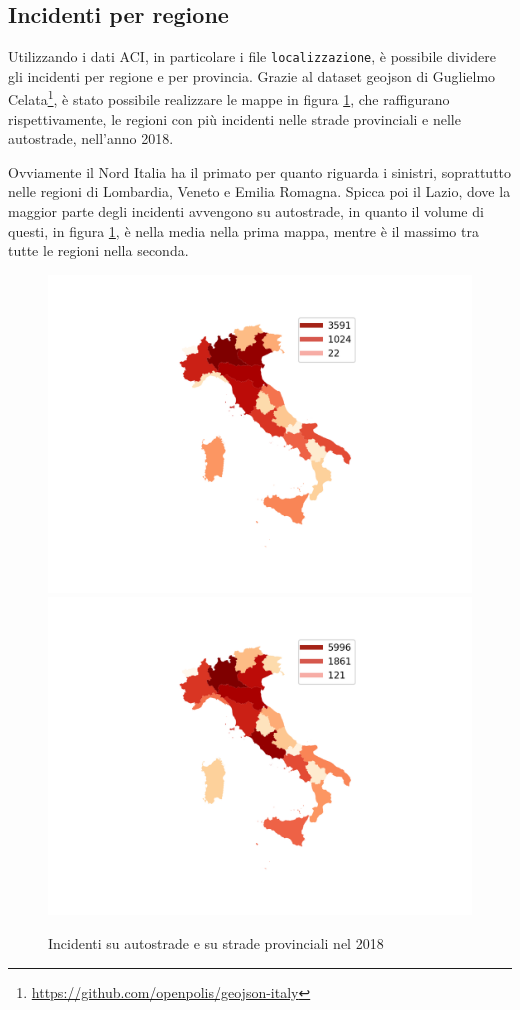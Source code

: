 \documentclass[a4paper,12pt]{report}
\newcommand{\columnstyle}[1]{\texttt{#1}}
\begin{document}
\subsection{Incidenti per regione}

Utilizzando i dati ACI, in particolare i file \columnstyle{localizzazione}, è 
possibile dividere gli incidenti per regione e per provincia.
Grazie al dataset geojson di Guglielmo 
Celata\footnote{\url{https://github.com/openpolis/geojson-italy}}, 
è stato possibile realizzare le mappe in figura \ref{fig:incidenti-per-regione}, 
che raffigurano rispettivamente, le regioni con più incidenti 
nelle strade provinciali e nelle autostrade, nell'anno 2018.

Ovviamente il Nord Italia ha il primato per quanto riguarda i sinistri, 
soprattutto nelle regioni di Lombardia, Veneto e Emilia Romagna. 
Spicca poi il Lazio, dove la maggior parte degli incidenti avvengono su autostrade, 
in quanto il volume di questi, in figura \ref{fig:incidenti-per-regione}, 
è nella media nella prima mappa, mentre è il massimo tra tutte le regioni nella seconda.

\begin{figure}
    \includegraphics[width=0.5\linewidth]{../src/incidenti/incidenti_aci/mappe_regioni/incidenti_regione.png}
    \includegraphics[width=0.5\linewidth]{../src/incidenti/incidenti_aci/mappe_regioni/incidenti_regione_autostrade.png}
    \caption{Incidenti su autostrade e su strade provinciali nel 2018}
    \label{fig:incidenti-per-regione}
\end{figure}
\end{document}
